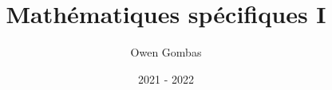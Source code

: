 \documentclass[french,a4paper,11pt]{report}
\title{Mathématiques spécifiques I}
\author{Owen Gombas}
\date{2021 - 2022}
\begin{document}
\maketitle
\tableofcontents{}


\end{document}
